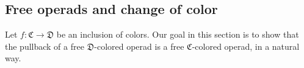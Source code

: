 \documentclass[a4paper,10pt
,draft
]{article}%
\renewcommand{\hat}{\widehat}
\renewcommand{\1}{\eta}%
\begin{document}

        



\subsection{Free operads and change of color}


Let $f \colon \mathfrak{C} \to \mathfrak{D}$ be an inclusion of colors.
Our goal in this section is to show that the pullback of a free $\mathfrak{D}$-colored operad is a free $\mathfrak{C}$-colored operad, in a natural way.
\end{document}

